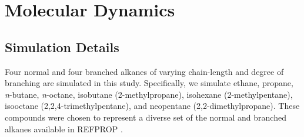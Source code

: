 \documentclass[preprint,letterpaper,floatfix,citeautoscript,aip,jcp]{revtex4-1}
\begin{document}

\section{Molecular Dynamics} \label{Methods I}

\subsection{Simulation Details}
Four normal and four branched alkanes of varying chain-length and degree of branching are simulated in this study. Specifically, we simulate ethane, propane, \textit{n}-butane, \textit{n}-octane, isobutane (2-methylpropane), isohexane (2-methylpentane), isooctane (2,2,4-trimethylpentane), and neopentane (2,2-dimethylpropane). These compounds were chosen to represent a diverse set of the normal and branched alkanes available in REFPROP \cite{LEMMON-RP91,Ethane2006,Propane2009,Butane2006,Beckmueller2017,Lemmon2006,Blackham2017}.
\end{document}
